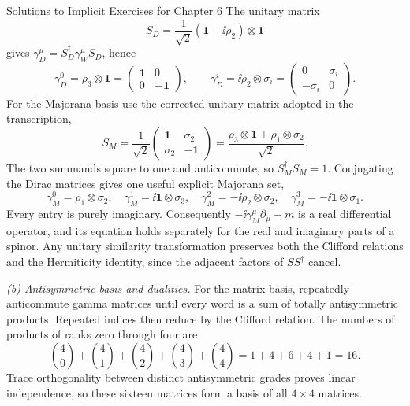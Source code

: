 \begin{bankssolutions}{Solutions to Implicit Exercises for Chapter 6}
The unitary matrix
\begin{equation*}
 S_D=\frac{1}{\sqrt2}(\mathbf1-\ii\rho_2)\otimes\mathbf1
\end{equation*}
gives \(\gamma_D^\mu=S_D^\dagger\gamma_W^\mu S_D\), hence
\begin{equation*}
 \gamma_D^0=\rho_3\otimes\mathbf1
 =\begin{pmatrix}\mathbf1&0\\0&-\mathbf1\end{pmatrix},
 \qquad
 \gamma_D^i=\ii\rho_2\otimes\sigma_i
 =\begin{pmatrix}0&\sigma_i\\-\sigma_i&0\end{pmatrix}.
\end{equation*}
For the Majorana basis use the corrected unitary matrix adopted in the
transcription,
\begin{equation*}
 S_M=\frac{1}{\sqrt2}
 \begin{pmatrix}\mathbf1&\sigma_2\\ \sigma_2&-\mathbf1\end{pmatrix}
 =\frac{\rho_3\otimes\mathbf1+\rho_1\otimes\sigma_2}{\sqrt2}.
\end{equation*}
The two summands square to one and anticommute, so
\(S_M^\dagger S_M=1\).  Conjugating the Dirac matrices gives one useful
explicit Majorana set,
\begin{equation*}
 \gamma_M^0=\rho_1\otimes\sigma_2,
 \quad \gamma_M^1=\ii\mathbf1\otimes\sigma_3,
 \quad \gamma_M^2=-\ii\rho_2\otimes\sigma_2,
 \quad \gamma_M^3=-\ii\mathbf1\otimes\sigma_1.
\end{equation*}
Every entry is purely imaginary.  Consequently
\(-\ii\gamma_M^\mu\partial_\mu-m\) is a real differential operator, and
its equation holds separately for the real and imaginary parts of a
spinor.  Any unitary similarity transformation preserves both the Clifford
relations and the Hermiticity identity, since the adjacent factors of
\(SS^\dagger\) cancel.

\textit{(b) Antisymmetric basis and dualities.}
For the matrix basis, repeatedly anticommute gamma matrices until every word
is a sum of totally antisymmetric products.  Repeated indices then reduce by
the Clifford relation.  The numbers of products of ranks zero through four
are
\begin{equation*}
 \binom40+\binom41+\binom42+\binom43+\binom44
 =1+4+6+4+1=16.
\end{equation*}
Trace orthogonality between distinct antisymmetric grades proves linear
independence, so these sixteen matrices form a basis of all \(4\times4\)
matrices.


\end{bankssolutions}
